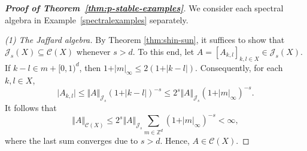 \documentclass{amsart}
\begin{document}
\begin{proof}[\textbf{Proof of Theorem~\ref{thm:p-stable-examples}}]
We consider each spectral algebra in
Example~\ref{spectralexamples} separately.

\emph{(1) The Jaffard algebra.}
By Theorem \ref{thm:shin-sun}, it suffices to show that $\mathcal{J}_s(X) \subseteq \mathcal C(X)$ whenever $s>d$. To this end, let \(A = [A_{k,l}]_{k,l\in X} \in\mathcal J_s(X)\). If \(k-l\in m+[0,1)^d\), then $1+\vert m\vert_\infty \leq 2(1+\vert k-l\vert)$. Consequently, for each $k,l\in X$,
$$\vert A_{k,l}\vert \leq \Vert A\Vert_{\mathcal J_s}(1+\vert k-l \vert)^{-s} \leq 2^s\Vert A\Vert_{\mathcal J_s} (1+\vert m\vert_\infty)^{-s}.$$
It follows that
$$ \Vert A\Vert_{\mathcal{C}(X)} \leq 2^s\Vert A\Vert_{\mathcal J_s} \sum_{m\in\mathbb Z^d}(1+\vert m \vert_\infty)^{-s} < \infty ,$$
where the last sum converges due to $s>d$. Hence, $A\in \mathcal{C}(X)$.


\end{proof}
\end{document}
